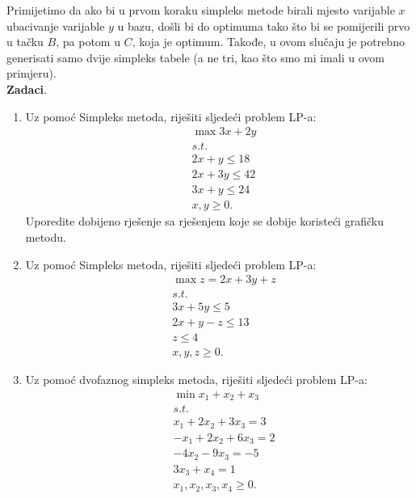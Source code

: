 \documentclass[a4paper, utf8, 11pt, colorlinks]{book}
\begin{document}
Primijetimo da ako bi u prvom koraku simpleks metode birali mjesto varijable $x$ ubacivanje varijable $y$ u bazu, došli bi do optimuma tako što bi se pomijerili   prvo u tačku $B$, pa potom u $C$, koja je optimum. Takođe, u ovom slučaju je potrebno generisati samo dvije simpleks tabele (a ne tri, kao što smo mi imali u ovom primjeru).\vspace{1cm}
\\
\textbf{\Large Zadaci}.
\begin{enumerate}
 \item Uz pomoć Simpleks metoda, riješiti sljedeći problem LP-a:%
 \begin{align*}
 	 &\max  3x + 2y \\
 	 & s.t. \\
 	 & 2x + y \leq 18 \\
 	 & 2x + 3y \leq 42 \\
 	 & 3x + y \leq 24 \\
 	 & x,y \geq 0.
 \end{align*} 
Uporedite dobijeno rješenje sa rješenjem koje se dobije 
koristeći grafičku metodu.
\item %
   Uz pomoć Simpleks metoda, riješiti sljedeći problem LP-a:
 \begin{align*}
 	  &\max z = 2x + 3y + z \\
 	  & s.t. \\
 	  & 3x + 5 y \leq 5 \\
 	  & 2x + y - z \leq 13 \\
 	  & z \leq 4 \\
 	  & x,y,z \geq 0.
 \end{align*}
\item Uz pomoć dvofaznog simpleks metoda, riješiti sljedeći problem LP-a:%
   \begin{align*}
   	    &\min  x_1 + x_2 + x_3 \\
   	    & s.t. \\
   	    & x_1 + 2 x_2 + 3 x_3 = 3 \\
   	    & -x_1 + 2 x_2 + 6 x_3 = 2 \\
   	    & - 4x_2 - 9 x_3 = -5 \\
   	    & 3 x_3 + x_4 = 1 \\
   	    & x_1, x_2, x_3, x_4 \geq 0.

\end{align*}
\end{enumerate}
\end{document}
